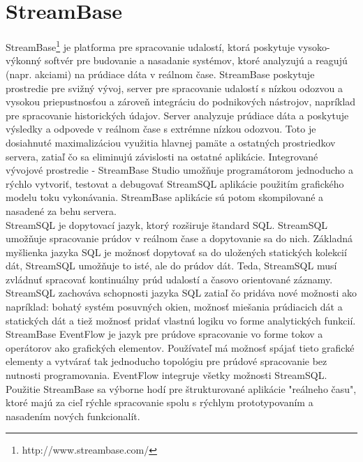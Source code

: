 \section{StreamBase}
StreamBase\footnote{http://www.streambase.com/} je platforma pre spracovanie udalostí, ktorá poskytuje vysoko-výkonný softvér pre budovanie a nasadanie systémov, ktoré analyzujú a reagujú (napr. akciami) na prúdiace dáta v reálnom čase. StreamBase poskytuje prostredie pre svižný vývoj, server pre spracovanie udalostí s nízkou odozvou a vysokou priepustnosťou a zároveň integráciu do podnikových nástrojov, napríklad pre spracovanie historických údajov. Server analyzuje prúdiace dáta a poskytuje výsledky a odpovede v reálnom čase s extrémne nízkou odozvou. Toto je dosiahnuté maximalizáciou využitia hlavnej pamäte a ostatných prostriedkov servera, zatiaľ čo sa eliminujú závislosti na ostatné aplikácie. Integrované vývojové prostredie - StreamBase Studio umožňuje programátorom jednoducho a rýchlo vytvoriť, testovat a debugovať StreamSQL aplikácie použitím grafického modelu toku vykonávania. StreamBase aplikácie sú potom skompilované a nasadené za behu servera. \\

StreamSQL je dopytovací jazyk, ktorý rozširuje štandard SQL. StreamSQL umožňuje spracovanie prúdov v reálnom čase a dopytovanie sa do nich. Základná myšlienka jazyka SQL je možnosť dopytovať sa do uložených statických kolekcií dát, StreamSQL umožňuje to isté, ale do prúdov dát. Teda, StreamSQL musí zvládnuť spracovať kontinuálny prúd udalostí a časovo orientované záznamy. StreamSQL zachováva schopnosti jazyka SQL zatiaľ čo pridáva nové možnosti ako napríklad: bohatý systém posuvných okien, možnosť miešania prúdiacich dát a statických dát a tiež možnosť pridať vlastnú logiku vo forme analytických funkcií. \\

StreamBase EventFlow je jazyk pre prúdove spracovanie vo forme tokov a operátorov ako grafických elementov. Používateľ má možnosť spájať tieto grafické elementy a vytvárať tak jednoducho topológiu pre prúdové spracovanie bez nutnosti programovania. EventFlow integruje všetky možnosti StreamSQL. \\

Použitie StreamBase sa výborne hodí pre štrukturované aplikácie "reálneho času", ktoré majú za cieľ rýchle spracovanie spolu s rýchlym prototypovaním a nasadením nových funkcionalít.
\label{fig:streambase}

